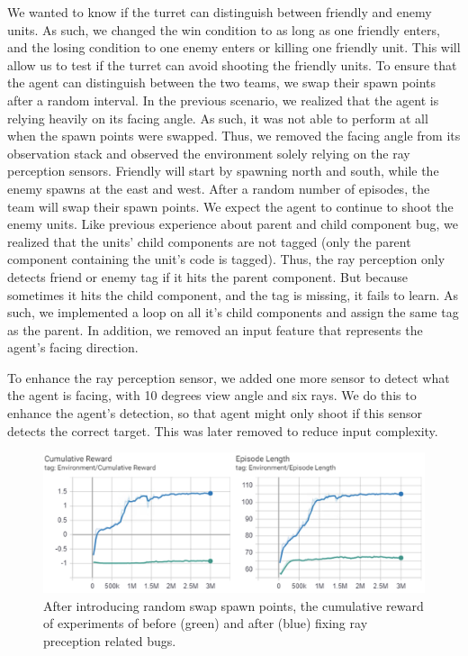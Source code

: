 \documentclass[conference]{IEEEtran}
\begin{document}
We wanted to know if the turret can distinguish between friendly and enemy units. As such, we changed the win condition to as long as one friendly enters, and the losing condition to one enemy enters or killing one friendly unit. This will allow us to test if the turret can avoid shooting the friendly units. To ensure that the agent can distinguish between the two teams, we swap their spawn points after a random interval. In the previous scenario, we realized that the agent is relying heavily on its facing angle. As such, it was not able to perform at all when the spawn points were swapped. Thus, we removed the facing angle from its observation stack and observed the environment solely relying on the ray perception sensors. Friendly will start by spawning north and south, while the enemy spawns at the east and west. After a random number of episodes, the team will swap their spawn points. We expect the agent to continue to shoot the enemy units. Like previous experience about parent and child component bug, we realized that the units' child components are not tagged (only the parent component containing the unit's code is tagged). Thus, the ray perception only detects friend or enemy tag if it hits the parent component. But because sometimes it hits the child component, and the tag is missing, it fails to learn. As such, we implemented a loop on all it's child components and assign the same tag as the parent. In addition, we removed an input feature that represents the agent's facing direction.

To enhance the ray perception sensor, we added one more sensor to detect what the agent is facing, with 10 degrees view angle and six rays. We do this to enhance the agent's detection, so that agent might only shoot if this sensor detects the correct target. This was later removed to reduce input complexity.

\begin{figure}[ht]
\centerline{\includegraphics[width=1\textwidth]{assets/scene2_combine_1}}
\caption{After introducing random swap spawn points, the cumulative reward of experiments of before (green) and after (blue) fixing ray preception related bugs.}
\label{scene2reward}
\end{figure}
\end{document}
